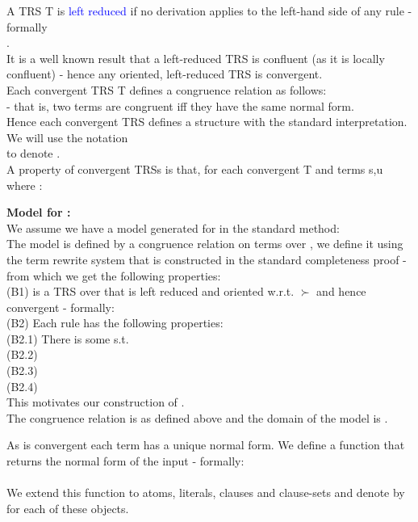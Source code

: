 A TRS T is \textcolor{blue}{left reduced} if no derivation applies to the left-hand side of any rule - formally \\
.\\
It is a well known result that a left-reduced TRS is confluent (as it is locally confluent) - 
hence any oriented, left-reduced TRS is convergent.\\
Each convergent TRS T defines a congruence relation \m{\textcolor{blue}{=_T}} as follows:\\
 - that is, two terms are congruent iff they have the same normal form.\\
Hence each convergent TRS defines a structure with the standard interpretation.\\
We will use the notation\\
 to denote .\\
A property of convergent TRSs is that, for each convergent T and terms s,u where :\\

\textbf{Model for :}\\
We assume we have a model \m{\textcolor{blue}{I^b}} generated for  in the standard method:\\
The model  is defined by a congruence relation on terms over \langb, we define it using the term rewrite system  that is constructed in the standard completeness proof - from which we get the following properties:\\
(B1)  is a TRS over \langb that is left reduced and oriented w.r.t. $\succ$ and hence convergent - formally:\\
(B2) Each rule  has the following properties:\\
(B2.1) There is some  s.t.\\
(B2.2) \\
(B2.3) \\
(B2.4) \\
This motivates our construction of \eqg.\\
The congruence relation is  as defined above and the domain of the model is . 

\noindent
As  is convergent each term has a unique normal form. We define a function \m{\textcolor{blue}{r^b}} that returns the normal form of the input - formally:\\
\\
We extend this function to atoms, literals, clauses and clause-sets and denote  by  for each of these objects. 

